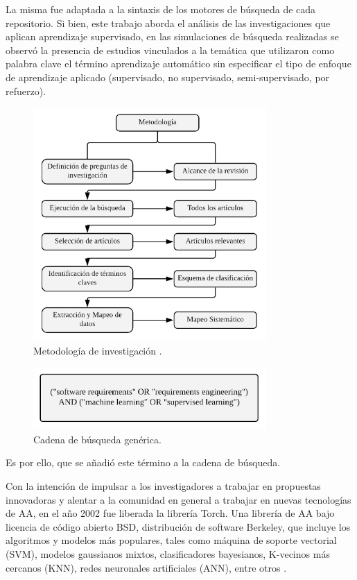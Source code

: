 \documentclass[journal]{IEEEtran}
\begin{document}
La misma fue adaptada a la sintaxis de los motores de búsqueda de cada repositorio. Si bien, este trabajo aborda el análisis de las investigaciones que aplican aprendizaje supervisado, en las simulaciones de búsqueda realizadas se observó la presencia de estudios vinculados a la temática que utilizaron como palabra clave el término aprendizaje automático sin especificar el tipo de enfoque de aprendizaje aplicado (supervisado, no supervisado, semi-supervisado, por refuerzo).

\begin{figure}[!t]
\centering
\includegraphics[width=3.5in]{figures/figure2_Guada.png}
\caption{Metodología de investigación \cite{petersen2008systematic}.}
\label{fig:2}
\end{figure}


\begin{figure}[!t]
\centering
\includegraphics[width=3.5in]{figures/figure3_Guada.png}
\caption{Cadena de búsqueda genérica.}
\label{fig:3}
\end{figure}

Es por ello, que se añadió este término a la cadena de búsqueda.

Con la intención de impulsar a los investigadores a trabajar en propuestas innovadoras y alentar a la comunidad en general a trabajar en nuevas tecnologías de AA, en el año 2002 fue liberada la librería Torch. Una librería de AA bajo licencia de código abierto BSD, distribución de software Berkeley, que 
incluye los algoritmos y modelos más populares, tales como máquina de soporte vectorial (SVM), modelos gaussianos mixtos, clasificadores bayesianos, K-vecinos más cercanos (KNN), redes neuronales artificiales (ANN), entre otros \cite{collobert2002torch}.
\end{document}

